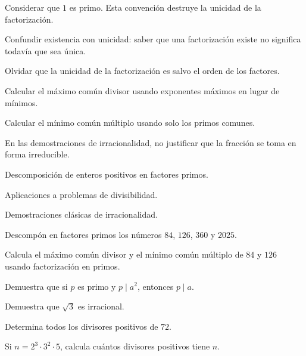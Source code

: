 \begin{erroresfrecuentes}
  \item Considerar que \(1\) es primo. Esta convención destruye la unicidad de la factorización.
  \item Confundir existencia con unicidad: saber que una factorización existe no significa todavía que sea única.
  \item Olvidar que la unicidad de la factorización es salvo el orden de los factores.
  \item Calcular el máximo común divisor usando exponentes máximos en lugar de mínimos.
  \item Calcular el mínimo común múltiplo usando solo los primos comunes.
  \item En las demostraciones de irracionalidad, no justificar que la fracción se toma en forma irreducible.
\end{erroresfrecuentes}

\begin{seminario}
  \item Descomposición de enteros positivos en factores primos.
  \item Aplicaciones a problemas de divisibilidad.
  \item Demostraciones clásicas de irracionalidad.
\end{seminario}

\begin{ejerciciospropuestos}
  \item Descompón en factores primos los números \(84\), \(126\), \(360\) y \(2025\).
  \item Calcula el máximo común divisor y el mínimo común múltiplo de \(84\) y \(126\) usando factorización en primos.
  \item Demuestra que si \(p\) es primo y \(p\mid a^2\), entonces \(p\mid a\).
  \item Demuestra que \(\sqrt{3}\) es irracional.
  \item Determina todos los divisores positivos de \(72\).
  \item Si \(n=2^3\cdot 3^2\cdot 5\), calcula cuántos divisores positivos tiene \(n\).
\end{ejerciciospropuestos}

